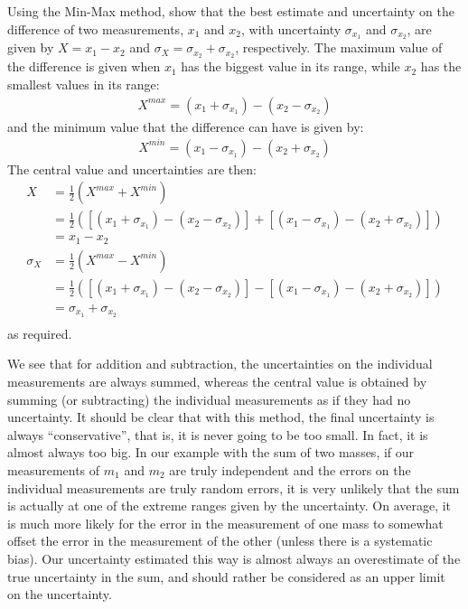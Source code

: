 \begin{example}{Using the Min-Max method, show that the best estimate and uncertainty on the difference of two measurements, $x_1$ and $x_2$, with uncertainty $\sigma_{x_1}$ and $\sigma_{x_2}$, are given by $X=x_1-x_2$ and $\sigma_{X} =\sigma_{x_2} + \sigma_{x_2}$, respectively.}
The maximum value of the difference is given when $x_1$ has the biggest value in its range, while $x_2$ has the smallest values in its range:
\begin{align*}
X^{max}=(x_1+\sigma_{x_1})-(x_2-\sigma_{x_2})
\end{align*}
and the minimum value that the difference can have is given by:
\begin{align*}
X^{min}=(x_1-\sigma_{x_1})-(x_2+\sigma_{x_2})
\end{align*}
The central value and uncertainties are then:
\begin{align*}
X&=\frac{1}{2}(X^{max}+X^{min})\nonumber\\
 &=\frac{1}{2}\left(\left[(x_1+\sigma_{x_1})-(x_2-\sigma_{x_2})\right]+\left[(x_1-\sigma_{x_1})-(x_2+\sigma_{x_2})\right]\right)\nonumber\\
 &=x_1-x_2\nonumber\\
\sigma_{X} &=\frac{1}{2}(X^{max}-X^{min})\nonumber\\
 &=\frac{1}{2}\left(\left[(x_1+\sigma_{x_1})-(x_2-\sigma_{x_2})\right]-\left[(x_1-\sigma_{x_1})-(x_2+\sigma_{x_2})\right]\right)\nonumber\\
 &=\sigma_{x_1}+ \sigma_{x_2}\nonumber\\
\end{align*}
as required.
\end{example}
We see that for addition and subtraction, the uncertainties on the individual measurements are always summed, whereas the central value is obtained by summing (or subtracting) the individual measurements as if they had no uncertainty. It should be clear that with this method, the final uncertainty is always ``conservative'', that is, it is never going to be too small. In fact, it is almost always too big. In our example with the sum of two masses, if our measurements of $m_1$ and $m_2$ are truly independent and the errors on the individual measurements are truly random errors, it is very unlikely that the sum is actually at one of the extreme ranges given by the uncertainty. On average, it is much more likely for the error in the measurement of one mass to somewhat offset the error in the measurement of the other (unless there is a systematic bias). Our uncertainty estimated this way is almost always an overestimate of the true uncertainty in the sum, and should rather be considered as an upper limit on the uncertainty. 
